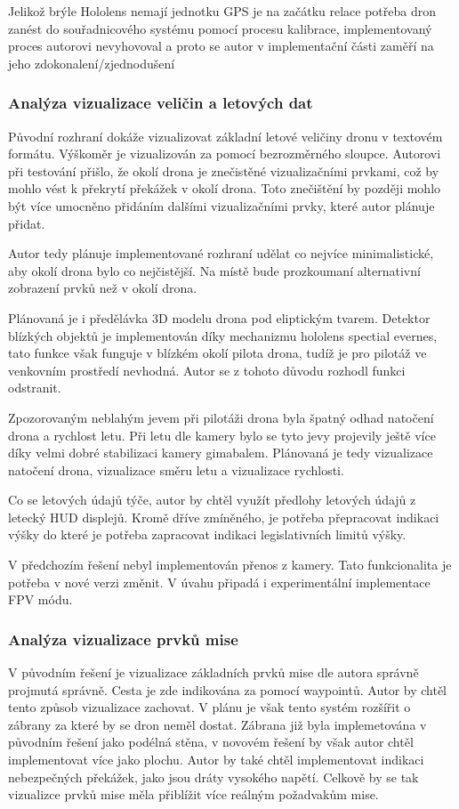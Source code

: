 Jelikož brýle Hololens nemají jednotku GPS je na začátku relace potřeba dron zanést do souřadnicového systému pomocí procesu kalibrace, implementovaný proces autorovi nevyhovoval a proto se autor v implementační části zaměří na jeho zdokonalení/zjednodušení
\subsubsection{Analýza  vizualizace veličin a letových dat}
Původní rozhraní dokáže vizualizovat základní letové veličiny dronu v textovém formátu. Výškoměr je vizualizován za pomocí bezrozměrného sloupce. Autorovi při testování přišlo, že okolí drona je znečistěné vizualizačními prvkami, což by mohlo vést k překrytí překážek v okolí drona. Toto znečištění by později mohlo být více umocněno přidáním dalšími vizualizačními prvky, které autor plánuje přidat. 

Autor tedy plánuje implementované rozhraní udělat co nejvíce minimalistické, aby okolí drona bylo co nejčistější.  Na místě bude prozkoumaní alternativní zobrazení prvků než  v okolí drona. 

Plánovaná je i předělávka 3D modelu drona pod eliptickým tvarem. Detektor blízkých objektů je implementován díky mechanizmu hololens spectial evernes, tato funkce však funguje v blízkém okolí pilota drona, tudíž je pro pilotáž ve venkovním prostředí nevhodná. Autor se z tohoto důvodu rozhodl funkci odstranit. 

Zpozorovaným neblahým jevem při pilotáži drona byla špatný odhad natočení drona a rychlost letu. Při letu dle kamery bylo se tyto jevy projevily ještě více díky velmi dobré stabilizaci kamery gimabalem. Plánovaná je tedy vizualizace natočení drona, vizualizace směru letu a vizualizace rychlosti.

Co se letových údajů týče, autor by chtěl využít předlohy letových údajů z letecký HUD displejů. Kromě dříve zmíněného, je potřeba přepracovat indikaci výšky do které je potřeba zapracovat indikaci legislativních limitů výšky.

V předchozím řešení nebyl implementován přenos z kamery. Tato funkcionalita je potřeba v nové verzi změnit. V úvahu připadá i experimentální implementace FPV módu.
\subsubsection{Analýza vizualizace prvků mise}
V původním řešení je vizualizace základních prvků mise dle autora správně projmutá správně. Cesta je zde indikována za pomocí waypointů. Autor by chtěl tento způsob vizualizace zachovat. V plánu je však tento systém rozšířit o zábrany za které by se dron neměl dostat. Zábrana již byla implemetována v původním řešení jako podélná stěna, v novovém řešení by však autor chtěl implementovat více jako plochu. Autor by také chtěl implementovat indikaci nebezpečných překážek, jako jsou dráty vysokého napětí. Celkově by se tak vizualizce prvků mise měla přiblížit více reálným požadvakům mise.


